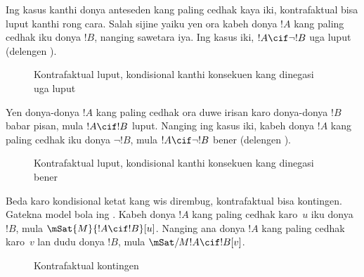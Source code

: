\documentclass[../../../include/open-logic-section]{subfiles}
\begin{document}
Ing kasus kanthi donya anteseden kang paling cedhak kaya iki,
kontrafaktual bisa luput kanthi rong cara. Salah sijine yaiku
yen ora kabeh donya $!A$ kang paling cedhak iku donya $!B$,
nanging sawetara iya. Ing kasus iki, $!A \cif \lnot !B$ uga
luput (delengen ).
\begin{figure}
\begin{center}
\caption{Kontrafaktual luput, kondisional kanthi konsekuen kang dinegasi uga luput}
\end{center}
\end{figure}
Yen donya-donya $!A$ kang paling cedhak ora duwe irisan karo
donya-donya $!B$ babar pisan, mula $!A \cif !B$ luput.
Nanging ing kasus iki, kabeh donya $!A$ kang paling cedhak
iku donya $\lnot !B$, mula $!A \cif \lnot !B$ bener
(delengen ).
\begin{figure}
\begin{center}
\caption{Kontrafaktual luput, kondisional kanthi konsekuen kang dinegasi bener}
\end{center}
\end{figure}

Beda karo kondisional ketat kang wis dirembug, kontrafaktual bisa
kontingen. Gatekna model bola ing .
Kabeh donya $!A$ kang paling cedhak karo~$u$ iku donya $!B$,
mula $\mSat{M}{!A \cif !B}[u]$. Nanging ana donya $!A$
kang paling cedhak karo~$v$ lan dudu donya $!B$, mula
$\mSat/{M}{!A \cif !B}[v]$.
\begin{figure}
\begin{center}
\end{center}
\caption{Kontrafaktual kontingen}
\end{figure}
\end{document}
